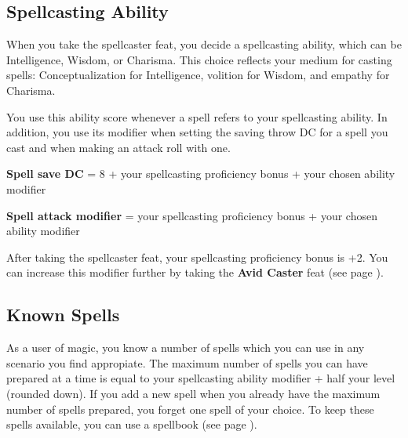 



\subsection*{Spellcasting Ability}
    When you take the spellcaster feat, you decide a spellcasting ability, which can be Intelligence, Wisdom, or Charisma.
    This choice reflects your medium for casting spells: Conceptualization for Intelligence, volition for Wisdom, and empathy for Charisma.

    You use this ability score whenever a spell refers to your spellcasting ability.
    In addition, you use its modifier when setting the saving throw DC for a spell you cast and when making an attack roll with one.

    \textbf{Spell save DC} = 8 + your spellcasting proficiency bonus + your chosen ability modifier

    \textbf{Spell attack modifier} = your spellcasting proficiency bonus + your chosen ability modifier

    After taking the spellcaster feat, your spellcasting proficiency bonus is +2.
    You can increase this modifier further by taking the \textbf{Avid Caster} feat (see page \pageref{feat::avidcaster}).

\subsection*{Known Spells}
    As a user of magic, you know a number of spells which you can use in any scenario you find appropiate.
    The maximum number of spells you can have prepared at a time is equal to your spellcasting ability modifier + half your level (rounded down).
    If you add a new spell when you already have the maximum number of spells prepared, you forget one spell of your choice.
    To keep these spells available, you can use a spellbook (see page \pageref{item::spellbook}).

